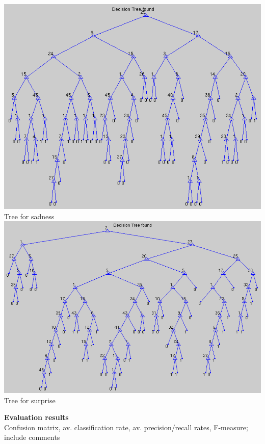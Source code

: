 \documentclass[12pt]{article}
\begin{document}
\begin{center}
  \includegraphics[scale=0.28]{report-images/tree5.png} \\
  Tree for sadness \\
  \vspace{\baselineskip}
  \includegraphics[scale=0.28]{report-images/tree6.png} \\
  Tree for surprise
\end{center}


{\bf Evaluation results} \\
Confusion matrix, av. classification rate, av. precision/recall rates, F-measure; include comments \\ \\
\end{document}
